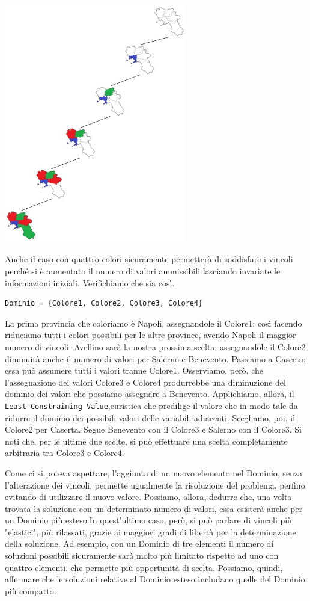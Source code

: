 		\begin{center}
			\includegraphics[width=0.6\textwidth, height=0.4\textheight]{SearchTree.jpg}
		\end{center}\par
		Anche il caso con quattro colori sicuramente permetterà di soddisfare i vincoli perché si è aumentato il numero di valori ammissibili lasciando invariate le informazioni iniziali. Verifichiamo che sia così.
		\begin{lstlisting}
Dominio = {Colore1, Colore2, Colore3, Colore4}
		\end{lstlisting}
		La prima provincia che coloriamo è Napoli, assegnandole il Colore1: così facendo riduciamo tutti i colori possibili per le altre province, avendo Napoli il maggior numero di vincoli. Avellino sarà la nostra prossima scelta: assegnandole il Colore2 diminuirà anche il numero di valori per Salerno e Benevento. Passiamo a Caserta: essa può assumere tutti i valori tranne Colore1. Osserviamo, però, che l'assegnazione dei valori Colore3 e Colore4 produrrebbe una diminuzione del dominio dei valori che possiamo assegnare a Benevento. Applichiamo, allora, il \texttt{Least Constraining Value},euristica che predilige il valore che in modo tale da ridurre il dominio dei possibili valori delle variabili adiacenti. Scegliamo, poi, il Colore2 per  Caserta. Segue Benevento con il Colore3 e Salerno con il Colore3. Si noti che, per le ultime due scelte, si può effettuare una scelta completamente arbitraria tra Colore3 e Colore4.\par
		Come ci si poteva aspettare, l'aggiunta di un nuovo elemento nel Dominio, senza l'alterazione dei vincoli, permette ugualmente la risoluzione del problema, perfino evitando di utilizzare il nuovo valore. Possiamo, allora, dedurre che, una volta trovata la soluzione con un determinato numero di valori, essa esisterà anche per un Dominio più esteso.In quest'ultimo caso, però, si può parlare di vincoli più "elastici", più rilassati, grazie ai maggiori gradi di libertà per la determinazione della soluzione. Ad esempio, con un Dominio di tre elementi il numero di soluzioni possibili sicuramente sarà molto più limitato rispetto ad uno con quattro elementi, che permette più opportunità di scelta. Possiamo, quindi, affermare che le soluzioni relative al Dominio esteso includano quelle del Dominio più compatto. 
